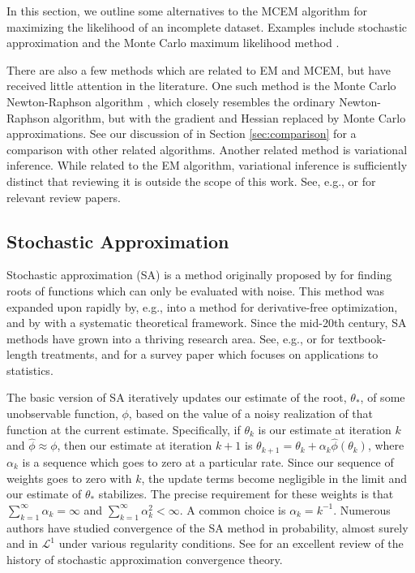 \documentclass[11pt, oneside]{article}   	%
\begin{document}
In this section, we outline some alternatives to the MCEM algorithm for maximizing the likelihood of an incomplete dataset. Examples include stochastic approximation \citep{Del99, Rob51, Lai03} and the Monte Carlo maximum likelihood method \citep{Gel93, Gey94}. 

There are also a few methods which are related to EM and MCEM, but have received little attention in the literature. One such method is the Monte Carlo Newton-Raphson algorithm \citep{Kuk97}, which closely resembles the ordinary Newton-Raphson algorithm, but with the gradient and Hessian replaced by Monte Carlo approximations. See our discussion of \citet{McC97} in Section \ref{sec:comparison} for a comparison with other related algorithms. Another related method is variational inference. While related to the EM algorithm, variational inference is sufficiently distinct that reviewing it is outside the scope of this work. See, e.g., \citet{Ble17} or \citet{Tsi08} for relevant review papers.


\subsection{Stochastic Approximation}
\label{sec:SAEM}

Stochastic approximation (SA) is a method originally proposed by \citet{Rob51} for finding roots of functions which can only be evaluated with noise. This method was expanded upon rapidly by, e.g., \citet{Kie52} into a method for derivative-free optimization, and by \citet{Dvo56} with a systematic theoretical framework. Since the mid-20th century, SA methods have grown into a thriving research area. See, e.g., \citet{Kus97} or \citet{Bor22} for textbook-length treatments, and \citet{Lai03} for a survey paper which focuses on applications to statistics.

The basic version of SA iteratively updates our estimate of the root, $\theta_*$, of some unobservable function, $\phi$, based on the value of a noisy realization of that function at the current estimate. Specifically, if $\theta_k$ is our estimate at iteration $k$ and $\hat{\phi} \approx \phi$, then our estimate at iteration $k+1$ is $\theta_{k+1} = \theta_k + \alpha_k \hat{\phi}(\theta_k)$, where $\alpha_k$ is a sequence which goes to zero at a particular rate. Since our sequence of weights goes to zero with $k$, the update terms become negligible in the limit and our estimate of $\theta_*$ stabilizes. The precise requirement for these weights is that $\sum_{k=1}^\infty \alpha_k = \infty$ and $\sum_{k=1}^\infty \alpha_k^2 < \infty$. A common choice is $\alpha_k = k^{-1}$. Numerous authors have studied convergence of the SA method in probability, almost surely and in $\mathcal{L}^1$ under various regularity conditions. See \citet{Lai03} for an excellent review of the history of stochastic approximation convergence theory.
\end{document}

